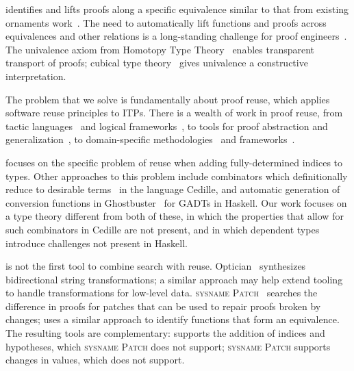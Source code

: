 
\toolnameb identifies and lifts proofs along a specific equivalence 
similar to that from existing ornaments work~\cite{ko2016programming}.
The need to automatically lift functions and proofs
across equivalences and other relations is a long-standing challenge for proof 
engineers~\cite{magaud2000changing, barthe2001type, magaud2003changing, huffman2013lifting, zimmermann2015automatic, cohen:hal-01414881}.
The univalence axiom from Homotopy Type Theory~\cite{univalent2013homotopy} enables transparent transport of proofs;
cubical type theory~\cite{cohen2016cubical} gives univalence a constructive interpretation. 

The problem that we solve is fundamentally about proof reuse,
which applies software reuse principles to ITPs. 
There is a wealth of work in proof reuse, from tactic languages~\cite{felty1994generalization} and logical frameworks~\cite{caplan1995logical},
to tools for proof abstraction and generalization~\cite{pons2000generalization, johnsen2004theorem},
to domain-specific methodologies~\cite{Delaware:2011:PLT:2048066.2048113} and frameworks~\cite{Delaware:2013:MLC:2429069.2429094}.

\toolnameb focuses on the specific problem of reuse
when adding fully-determined indices to types.
Other approaches to this problem include combinators which definitionally reduce to desirable terms~\cite{DBLP:journals/corr/abs-1803-08150} in the language Cedille,
and automatic generation of conversion functions in Ghostbuster~\cite{McDonell:2016:GTS:2951913.2951914} for GADTs in Haskell.
Our work focuses on a type theory different from both of these, in which the properties that allow for such combinators in Cedille are not present, and in which dependent types introduce challenges not present in Haskell.

\toolnameb is not the first tool to combine search with reuse. 
Optician~\cite{miltner2017synthesizing} synthesizes bidirectional string transformations;
a similar approach may help extend tooling to handle transformations for low-level data.
\textsc{sysname Patch}~\cite{ringer2018adapting} 
searches the difference in proofs for patches that can be used to repair proofs broken by changes;
\toolnameb uses a similar approach to identify functions
that form an equivalence. The resulting tools are complementary: \toolnameb supports the addition
of indices and hypotheses, which \textsc{sysname Patch} does not support; \textsc{sysname Patch} supports changes
in values, which \toolnameb does not support. 

